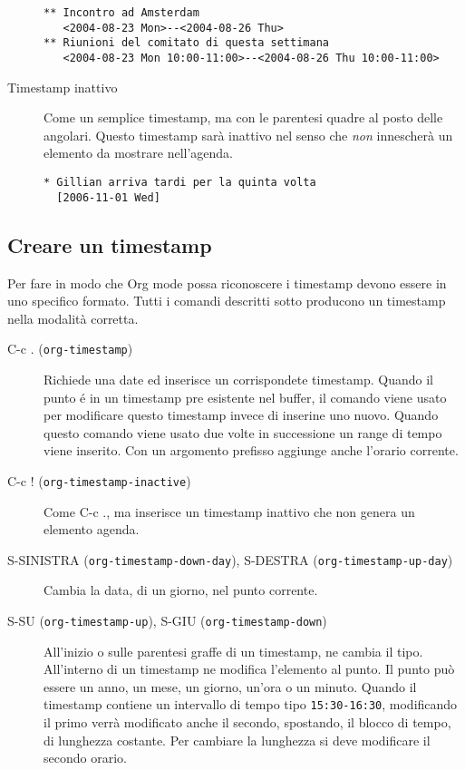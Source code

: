\documentclass[11pt]{article}
\begin{document}
\begin{description}
\begin{verbatim}
** Incontro ad Amsterdam
   <2004-08-23 Mon>--<2004-08-26 Thu>
** Riunioni del comitato di questa settimana
   <2004-08-23 Mon 10:00-11:00>--<2004-08-26 Thu 10:00-11:00>
\end{verbatim}

\item[{Timestamp inattivo}] Come un semplice timestamp, ma con le parentesi quadre al posto
delle angolari. Questo timestamp sarà inattivo nel senso che \emph{non}
innescherà un elemento da mostrare nell'agenda.

\begin{verbatim}
* Gillian arriva tardi per la quinta volta
  [2006-11-01 Wed]
\end{verbatim}
\end{description}

\subsection{Creare un timestamp}
\label{sec:org816e6ea}
Per fare in modo che Org mode possa riconoscere i timestamp devono
essere in uno specifico formato. Tutti i comandi descritti sotto
producono un timestamp nella modalità corretta.

\begin{description}
\item[{C-c . (\texttt{org-timestamp})}] Richiede una date ed inserisce un corrispondete timestamp. Quando il
punto é in un timestamp pre esistente nel buffer, il comando viene
usato per modificare questo timestamp invece di inserine uno
nuovo. Quando questo comando viene usato due volte in successione un
range di tempo viene inserito. Con un argomento prefisso aggiunge
anche l'orario corrente.

\item[{C-c ! (\texttt{org-timestamp-inactive})}] Come C-c ., ma inserisce un timestamp inattivo che non
genera un elemento agenda.

\item[{S-SINISTRA (\texttt{org-timestamp-down-day}), S-DESTRA (\texttt{org-timestamp-up-day})}] Cambia la data, di un giorno, nel punto corrente.

\item[{S-SU (\texttt{org-timestamp-up}), S-GIU (\texttt{org-timestamp-down})}] All'inizio o sulle parentesi graffe di un timestamp, ne cambia il
tipo. All'interno di un timestamp ne modifica l'elemento al
punto. Il punto può essere un anno, un mese, un giorno, un'ora o un
minuto. Quando il timestamp contiene un intervallo di tempo tipo
\texttt{15:30-16:30}, modificando il primo verrà modificato anche il
secondo, spostando, il blocco di tempo, di lunghezza costante. Per
cambiare la lunghezza si deve modificare il secondo orario.
\end{description}
\end{document}
